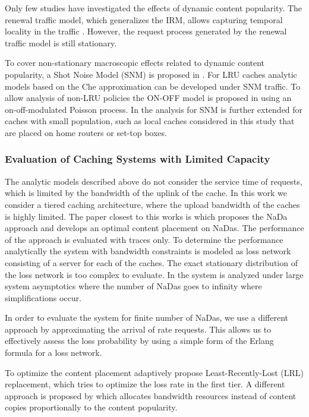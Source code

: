 Only few studies have investigated the effects of dynamic content popularity.
The renewal traffic model, which generalizes the IRM, allows capturing temporal locality in the traffic \cite{martina2014unified}.
However, the request process generated by the renewal traffic model is still stationary.

To cover non-stationary macroscopic effects related to dynamic content popularity, a Shot Noise Model (SNM) is proposed in \cite{traverso2013temporal}. For LRU caches analytic models based on the Che approximation can be developed under SNM traffic.
To allow analysis of non-LRU policies the ON-OFF model is proposed in \cite{garetto2014dynamic} using an on-off-modulated Poisson process.
In \cite{leconte2016dynamic} the analysis for SNM is further extended for caches with small population, such as local caches considered in this study that are placed on home routers or set-top boxes.

\subsubsection{Evaluation of Caching Systems with Limited Capacity}

The analytic models described above do not consider the service time of requests, which is limited by the bandwidth of the uplink of the cache.
In this work we consider a tiered caching architecture, where the upload bandwidth of the caches is highly limited.
The paper closest to this works is \cite{valancius2009greening} which proposes the NaDa approach and develops an optimal content placement on NaDas.
The performance of the approach is evaluated with traces only.
To determine the performance analytically the system with bandwidth constraints is modeled as loss network consisting of a server for each of the caches. The exact stationary distribution of the loss network is too complex to evaluate.
In \cite{tan2013optimal} the system is analyzed under large system asymptotics where the number of NaDas goes to infinity where simplifications occur.

In order to evaluate the system for finite number of NaDas, we use a different approach by approximating the arrival of rate requests.
This allows us to effectively assess the loss probability by using a simple form of the Erlang formula for a loss network.

To optimize the content placement adaptively \cite{leconte2014adaptive} propose Least-Recently-Lost (LRL) replacement, which tries to optimize the loss rate in the first tier.
A different approach is proposed by \cite{zhou2015unifying} which allocates bandwidth resources instead of content copies proportionally to the content popularity.

